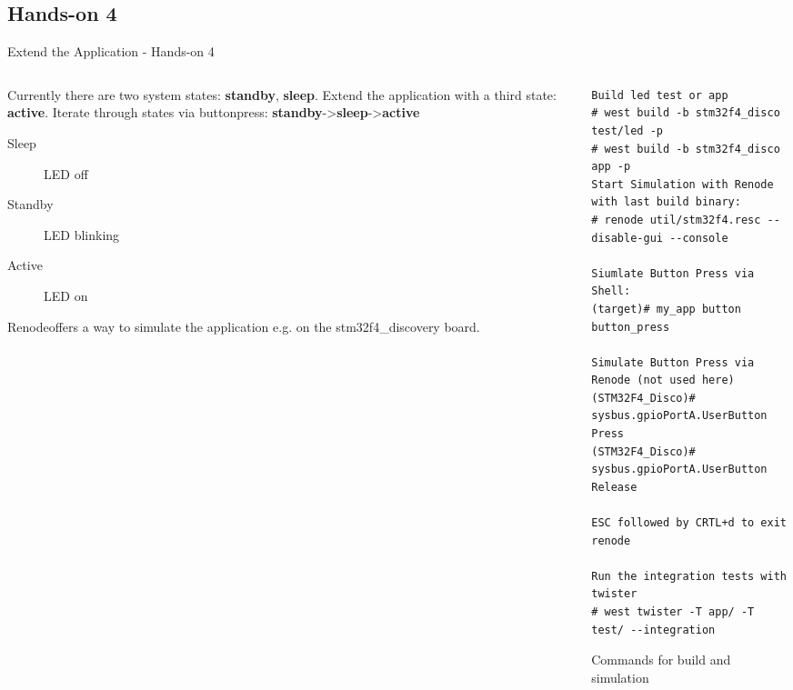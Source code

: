 \documentclass[10pt, aspectratio=169]{beamer}
\begin{document}
\subsection{Hands-on 4}
\begin{frame}[fragile]{Extend the Application - Hands-on 4}
  \begin{columns}
    \begin{column}{0.6\textwidth}
      Currently there are two system states: \textbf{standby}, \textbf{sleep}.
      Extend the application with a third state: \textbf{active}. Iterate
      through states via buttonpress:
      \textbf{standby}->\textbf{sleep}->\textbf{active}\footnotemark[1]
      \begin{description}
        \item [Sleep] LED off
        \item [Standby] LED blinking
        \item [Active] LED on
      \end{description}
	    Renode\footnotemark[2] offers a way to simulate the application e.g. on the stm32f4\_discovery board.
    \end{column}
    \begin{column}{0.4\textwidth}
      \begin{listing}[H]
        \begin{verbatim}
Build led test or app
# west build -b stm32f4_disco test/led -p
# west build -b stm32f4_disco app -p
Start Simulation with Renode with last build binary:
# renode util/stm32f4.resc --disable-gui --console

Siumlate Button Press via Shell:
(target)# my_app button button_press

Simulate Button Press via Renode (not used here)
(STM32F4_Disco)# sysbus.gpioPortA.UserButton Press
(STM32F4_Disco)# sysbus.gpioPortA.UserButton Release

ESC followed by CRTL+d to exit renode

Run the integration tests with twister
# west twister -T app/ -T test/ --integration
        \end{verbatim}
        \caption{\footnotesize{Commands for build and simulation}}
      \end{listing}
    \end{column}
  \end{columns}
\end{frame}
\end{document}
